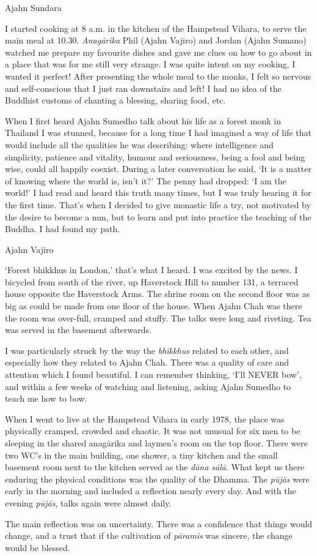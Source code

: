 Ajahn Sundara

I started cooking at 8 a.m. in the kitchen of the Hampstead Vihara, to
serve the main meal at 10.30. \emph{Anagārika} Phil (Ajahn Vajiro) and
Jordan (Ajahn Sumano) watched me prepare my favourite dishes and gave me
clues on how to go about in a place that was for me still very strange. 
I was quite intent on my cooking, I wanted it perfect! After presenting
the whole meal to the monks, I felt so nervous and self-conscious that I
just ran downstairs and left! I had no idea of the Buddhist customs of
chanting a blessing, sharing food, etc. 

When I first heard Ajahn Sumedho talk about his life as a forest monk in
Thailand I was stunned, because for a long time I had imagined a way of
life that would include all the qualities he was describing: where
intelligence and simplicity, patience and vitality, humour and
seriousness, being a fool and being wise, could all happily coexist. 
During a later conversation he said, `It is a matter of knowing where
the world is, isn't it?' The penny had dropped: `I am the world!' I had
read and heard this truth many times, but I was truly hearing it for the
first time. That's when I decided to give monastic life a try, not
motivated by the desire to become a nun, but to learn and put into
practice the teaching of the Buddha. I had found my path. 

Ajahn Vajiro

`Forest bhikkhus in London,' that's what I heard. I was excited by the
news. I bicycled from south of the river, up Haverstock Hill to number
131, a terraced house opposite the Haverstock Arms. The shrine room on
the second floor was as big as could be made from one floor of the
house. When Ajahn Chah was there the room was over-full, cramped and
stuffy. The talks were long and riveting. Tea was served in the basement
afterwards. 

I was particularly struck by the way the \emph{bhikkhus} related to each
other, and especially how they related to Ajahn Chah. There was a
quality of care and attention which I found beautiful. I can remember
thinking, `I'll NEVER bow', and within a few weeks of watching and
listening, asking Ajahn Sumedho to teach me how to bow. 

When I went to live at the Hampstead Vihara in early 1978, the place was
physically cramped, crowded and chaotic. It was not unusual for six men
to be sleeping in the shared anagārika and laymen's room on the top
floor. There were two WC's in the main building, one shower, a tiny
kitchen and the small basement room next to the kitchen served as the
\emph{dāna sālā}. What kept us there enduring the physical conditions
was the quality of the Dhamma. The \emph{pūjās} were early in the
morning and included a reflection nearly every day. And with the evening
\emph{pūjās}, talks again were almost daily. 

The main reflection was on uncertainty. There was a confidence that
things would change, and a trust that if the cultivation of
\emph{pāramis} was sincere, the change would be blessed. 

